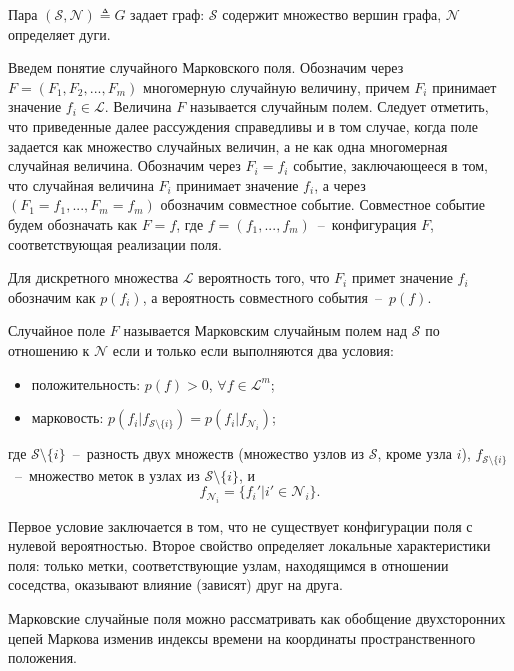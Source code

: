 Пара $(\mathcal{S},\mathcal{N}) \triangleq G$ задает граф: $\mathcal{S}$ содержит множество вершин графа, $\mathcal{N}$ определяет дуги.

Введем понятие случайного Марковского поля. Обозначим через  $F=(F_1,F_2,...,F_m)$ многомерную случайную величину, причем $F_i$ принимает значение $f_i \in \mathcal{L}$. Величина $F$ называется случайным полем. Следует отметить, что приведенные далее рассуждения справедливы и в том случае, когда поле задается как множество случайных величин, а не как одна многомерная случайная величина. Обозначим через $F_i=f_i$ событие, заключающееся в том, что случайная величина $F_i$ принимает значение $f_i$, а через $(F_1=f_1,...,F_m=f_m)$ обозначим совместное событие. Совместное событие будем обозначать как $F=f$, где $f=(f_1,...,f_m)$~--~конфигурация $F$, соответствующая реализации поля.

Для дискретного множества $\mathcal{L}$ вероятность того, что $F_i$ примет значение $f_i$ обозначим как $p(f_i)$, а вероятность совместного события~--~$p(f)$.

\begin{definition}
    Случайное поле $F$ называется Марковским случайным полем над $\mathcal{S}$ по отношению к $\mathcal{N}$ если и только если выполняются два условия:
    \begin{itemize}
        \item положительность: $p(f)>0$, $\forall f \in \mathcal{L}^m$;
        \item марковость: $p(f_i \vert f_{\mathcal{S}\setminus\{i\}})=p(f_i|f_{\mathcal{N}_i})$;
    \end{itemize}
    где $\mathcal{S}\setminus\{i\}$~--~разность двух множеств (множество узлов из $\mathcal{S}$, кроме узла $i$), $f_{\mathcal{S}\setminus\{i\}}$~--~множество меток в узлах из $\mathcal{S}\setminus\{i\}$, и
    \begin{equation}
        f_{\mathcal{N}_i} = \{ f_i'\vert i' \in \mathcal{N}_i \}.
    \end{equation}
\end{definition}
Первое условие заключается в том, что не существует конфигурации поля с нулевой вероятностью. Второе свойство определяет локальные характеристики поля: только метки, соответствующие узлам, находящимся в отношении соседства, оказывают влияние (зависят) друг на друга.

Марковские случайные поля можно рассматривать как обобщение двухсторонних цепей Маркова изменив индексы времени на координаты пространственного положения.

